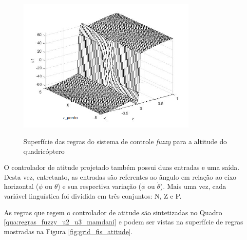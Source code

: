 

\begin{figure}[!htb]
    \centering
    \caption{Superfície das regras do sistema de controle \textit{fuzzy} para a altitude do quadricóptero}
    \includegraphics[width=0.8\textwidth]{./04-figuras/figuras_pos_banca/9-refinando-grids/editados/grid_fis_altitude}
    \label{fig:grid_fis_altitude}
\end{figure}

O controlador de atitude projetado também possui duas entradas e uma saída. Desta vez, entretanto, as entradas são referentes ao ângulo em relação ao eixo horizontal ($\phi$ ou $\theta$) e sua respectiva variação ($\dot{\phi}$ ou $\dot{\theta}$). Mais uma vez, cada variável linguística foi dividida em três conjuntos: N, Z e P.

As regras que regem o controlador de atitude são sintetizadas no Quadro \ref{qua:regras_fuzzy_u2_u3_mamdani} e podem ser vistas na superfície de regras mostradas na Figura \ref{fig:grid_fis_atitude}.



